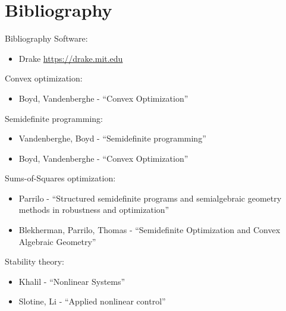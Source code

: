 \documentclass[aspectratio=169]{beamer}
\begin{document}
\section{Bibliography}
\begin{frame}{Bibliography}
\footnotesize
Software:
\begin{itemize}
\item
Drake \href{https://drake.mit.edu}{{\color{blue}https://drake.mit.edu}}
\end{itemize}
Convex optimization:
\begin{itemize}
\item
Boyd, Vandenberghe - ``Convex Optimization''
\end{itemize}
Semidefinite programming:
\begin{itemize}
\item
Vandenberghe, Boyd - ``Semidefinite programming''
\item
Boyd, Vandenberghe - ``Convex Optimization''
\end{itemize}
Sums-of-Squares optimization:
\begin{itemize}
\item
Parrilo - ``Structured semidefinite programs and semialgebraic geometry methods in robustness and optimization''
\item
Blekherman, Parrilo, Thomas - ``Semidefinite Optimization and Convex Algebraic Geometry''
\end{itemize}
Stability theory:
\begin{itemize}
\item
Khalil - ``Nonlinear Systems''
\item
Slotine, Li - ``Applied nonlinear control''
\end{itemize}
\end{frame}
\end{document}

